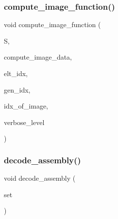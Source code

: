 \subsubsection{\texorpdfstring{compute\+\_\+image\+\_\+function()}{compute\_image\_function()}}
{\footnotesize\ttfamily void compute\+\_\+image\+\_\+function (\begin{DoxyParamCaption}\item[{\mbox{\hyperlink{classset__of__sets}{set\+\_\+of\+\_\+sets}} $\ast$}]{S,  }\item[{void $\ast$}]{compute\+\_\+image\+\_\+data,  }\item[{\mbox{\hyperlink{galois_8h_a09fddde158a3a20bd2dcadb609de11dc}{I\+NT}}}]{elt\+\_\+idx,  }\item[{\mbox{\hyperlink{galois_8h_a09fddde158a3a20bd2dcadb609de11dc}{I\+NT}}}]{gen\+\_\+idx,  }\item[{\mbox{\hyperlink{galois_8h_a09fddde158a3a20bd2dcadb609de11dc}{I\+NT}} \&}]{idx\+\_\+of\+\_\+image,  }\item[{\mbox{\hyperlink{galois_8h_a09fddde158a3a20bd2dcadb609de11dc}{I\+NT}}}]{verbose\+\_\+level }\end{DoxyParamCaption})}

\mbox{\label{pentomino__5x5_8_c_acbe7fd3f729d5451694b64ccff3a499a}} 
\subsubsection{\texorpdfstring{decode\+\_\+assembly()}{decode\_assembly()}}
{\footnotesize\ttfamily void decode\+\_\+assembly (\begin{DoxyParamCaption}\item[{\mbox{\hyperlink{galois_8h_a09fddde158a3a20bd2dcadb609de11dc}{I\+NT}} $\ast$}]{set }\end{DoxyParamCaption})}

\mbox{\label{pentomino__5x5_8_c_aae351f5ca69a05832ba21b27bba6a4e1}} 
